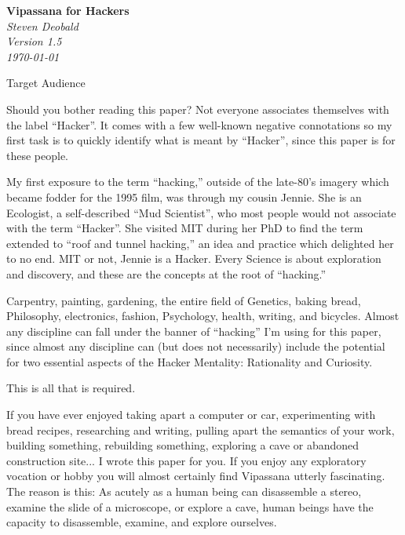\documentclass{article}
\begin{document}
\begin{titlepage}
   \begin{center}
     \Huge\textbf{Vipassana for Hackers}\\
     \vspace{5cm}
     \large\textit{Steven Deobald}\\
     \large\textit{Version 1.5}\\
     \large\textit\today
   \end{center}
\end{titlepage}

\begin{center}
  \Huge{Target Audience}
\end{center}

Should you bother reading this paper? Not everyone associates themselves with the label ``Hacker''. It comes with a few well-known negative connotations so my first task is to quickly identify what is meant by ``Hacker'', since this paper is for these people.

My first exposure to the term ``hacking,'' outside of the late-80's imagery which became fodder for the 1995 film, was through my cousin Jennie. She is an Ecologist, a self-described ``Mud Scientist'', who most people would not associate with the term ``Hacker''. She visited MIT during her PhD to find the term extended to ``roof and tunnel hacking,'' an idea and practice which delighted her to no end. MIT or not, Jennie is a Hacker. Every Science is about exploration and discovery, and these are the concepts at the root of ``hacking.''

Carpentry, painting, gardening, the entire field of Genetics, baking bread, Philosophy, electronics, fashion, Psychology, health, writing, and bicycles. Almost any discipline can fall under the banner of ``hacking'' I'm using for this paper, since almost any discipline can (but does not necessarily) include the potential for two essential aspects of the Hacker Mentality: Rationality and Curiosity.

This is all that is required.

If you have ever enjoyed taking apart a computer or car, experimenting with bread recipes, researching and writing, pulling apart the semantics of your work, building something, rebuilding something, exploring a cave or abandoned construction site... I wrote this paper for you. If you enjoy any exploratory vocation or hobby you will almost certainly find Vipassana utterly fascinating. The reason is this: As acutely as a human being can disassemble a stereo, examine the slide of a microscope, or explore a cave, human beings have the capacity to disassemble, examine, and explore ourselves.
\end{document}
